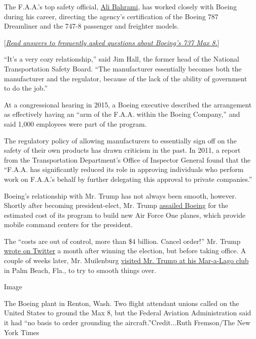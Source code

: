 The F.A.A.'s top safety official,
\href{https://www.faa.gov/about/key_officials/bahrami_avs/}{Ali
Bahrami}, has worked closely with Boeing during his career, directing
the agency's certification of the Boeing 787 Dreamliner and the 747-8
passenger and freighter models.

{[}\href{https://www.nytimes.com/2019/03/12/reader-center/737-max-8.html}{\emph{Read
answers to frequently asked questions about Boeing's 737 Max 8.}}{]}

``It's a very cozy relationship,'' said Jim Hall, the former head of the
National Transportation Safety Board. ``The manufacturer essentially
becomes both the manufacturer and the regulator, because of the lack of
the ability of government to do the job.''

At a congressional hearing in 2015, a Boeing executive described the
arrangement as effectively having an ``arm of the F.A.A. within the
Boeing Company,'' and said 1,000 employees were part of the program.

The regulatory policy of allowing manufacturers to essentially sign off
on the safety of their own products has drawn criticism in the past. In
2011, a report from the Transportation Department's Office of Inspector
General found that the ``F.A.A. has significantly reduced its role in
approving individuals who perform work on F.A.A.'s behalf by further
delegating this approval to private companies.''

Boeing's relationship with Mr. Trump has not always been smooth,
however. Shortly after becoming president-elect, Mr. Trump
\href{https://www.nytimes.com/2016/12/06/us/politics/trump-air-force-one-boeing.html?module=inline}{assailed
Boeing} for the estimated cost of its program to build new Air Force One
planes, which provide mobile command centers for the president.

The ``costs are out of control, more than \$4 billion. Cancel order!''
Mr. Trump
\href{https://twitter.com/realDonaldTrump/status/806134244384899072}{wrote
on Twitter} a month after winning the election, but before taking
office. A couple of weeks later, Mr. Muilenburg
\href{https://www.nytimes.com/2016/12/21/business/donald-trump-boeing-lockheed.html?module=inline}{visited
Mr. Trump at his Mar-a-Lago club} in Palm Beach, Fla., to try to smooth
things over.

Image

The Boeing plant in Renton, Wash. Two flight attendant unions called on
the United States to ground the Max 8, but the Federal Aviation
Administration said it had ``no basis to order grounding the
aircraft.''Credit...Ruth Fremson/The New York Times

